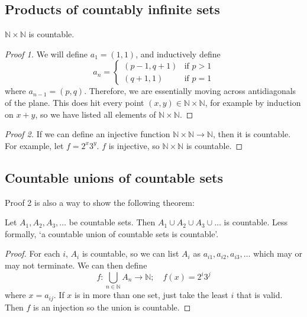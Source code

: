 \subsection{Products of countably infinite sets}
\begin{theorem}
	\(\mathbb N \times \mathbb N\) is countable.
\end{theorem}
\begin{proof}[Proof 1]
	We will define \(a_1 = (1, 1)\), and inductively define
	\[
		a_n = \begin{cases}
			(p-1, q+1) & \text{if } p > 1 \\
			(q+1, 1)   & \text{if } p = 1
		\end{cases}
	\]
	where \(a_{n-1} = (p, q)\).
	Therefore, we are essentially moving across antidiagonals of the plane.
	This does hit every point \((x, y) \in \mathbb N \times \mathbb N\), for example by induction on \(x+y\), so we have listed all elements of \(\mathbb N \times \mathbb N\).
\end{proof}
\begin{proof}[Proof 2]
	If we can define an injective function \(\mathbb N \times \mathbb N \to \mathbb N\), then it is countable.
	For example, let \(f = 2^x 3^y\).
	\(f\) is injective, so \(\mathbb N \times \mathbb N\) is countable.
\end{proof}

\subsection{Countable unions of countable sets}
Proof 2 is also a way to show the following theorem:
\begin{theorem}
	Let \(A_1, A_2, A_3, \dots\) be countable sets.
	Then \(A_1 \cup A_2 \cup A_3 \cup \dots\) is countable.
	Less formally, `a countable union of countable sets is countable'.
\end{theorem}
\begin{proof}
	For each \(i\), \(A_i\) is countable, so we can list \(A_i\) as \(a_{i1}, a_{i2}, a_{i3}, \dots\) which may or may not terminate.
	We can then define
	\[
		f\colon \bigcup_{n \in \mathbb N}A_n \to \mathbb N;\quad f(x) = 2^i 3^j
	\]
	where \(x = a_{ij}\).
	If \(x\) is in more than one set, just take the least \(i\) that is valid.
	Then \(f\) is an injection so the union is countable.
\end{proof}

